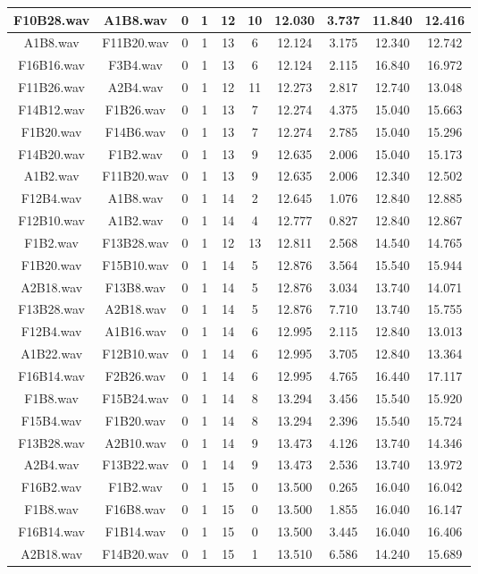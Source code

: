 \documentclass[11pt,a4paper]{book}
\begin{document}
\begin{longtable}[c]{|c|c|c|c|c|c|c|c|c|c|}
F10B28.wav&A1B8.wav&0&1&12&10&12.030&3.737&11.840&12.416\\ \hline
A1B8.wav&F11B20.wav&0&1&13&6&12.124&3.175&12.340&12.742\\ \hline
F16B16.wav&F3B4.wav&0&1&13&6&12.124&2.115&16.840&16.972\\ \hline
F11B26.wav&A2B4.wav&0&1&12&11&12.273&2.817&12.740&13.048\\ \hline
F14B12.wav&F1B26.wav&0&1&13&7&12.274&4.375&15.040&15.663\\ \hline
F1B20.wav&F14B6.wav&0&1&13&7&12.274&2.785&15.040&15.296\\ \hline
F14B20.wav&F1B2.wav&0&1&13&9&12.635&2.006&15.040&15.173\\ \hline
A1B2.wav&F11B20.wav&0&1&13&9&12.635&2.006&12.340&12.502\\ \hline
F12B4.wav&A1B8.wav&0&1&14&2&12.645&1.076&12.840&12.885\\ \hline
F12B10.wav&A1B2.wav&0&1&14&4&12.777&0.827&12.840&12.867\\ \hline
F1B2.wav&F13B28.wav&0&1&12&13&12.811&2.568&14.540&14.765\\ \hline
F1B20.wav&F15B10.wav&0&1&14&5&12.876&3.564&15.540&15.944\\ \hline
A2B18.wav&F13B8.wav&0&1&14&5&12.876&3.034&13.740&14.071\\ \hline
F13B28.wav&A2B18.wav&0&1&14&5&12.876&7.710&13.740&15.755\\ \hline
F12B4.wav&A1B16.wav&0&1&14&6&12.995&2.115&12.840&13.013\\ \hline
A1B22.wav&F12B10.wav&0&1&14&6&12.995&3.705&12.840&13.364\\ \hline
F16B14.wav&F2B26.wav&0&1&14&6&12.995&4.765&16.440&17.117\\ \hline
F1B8.wav&F15B24.wav&0&1&14&8&13.294&3.456&15.540&15.920\\ \hline
F15B4.wav&F1B20.wav&0&1&14&8&13.294&2.396&15.540&15.724\\ \hline
F13B28.wav&A2B10.wav&0&1&14&9&13.473&4.126&13.740&14.346\\ \hline
A2B4.wav&F13B22.wav&0&1&14&9&13.473&2.536&13.740&13.972\\ \hline
F16B2.wav&F1B2.wav&0&1&15&0&13.500&0.265&16.040&16.042\\ \hline
F1B8.wav&F16B8.wav&0&1&15&0&13.500&1.855&16.040&16.147\\ \hline
F16B14.wav&F1B14.wav&0&1&15&0&13.500&3.445&16.040&16.406\\ \hline
A2B18.wav&F14B20.wav&0&1&15&1&13.510&6.586&14.240&15.689\\ \hline

\end{longtable}
\end{document}
